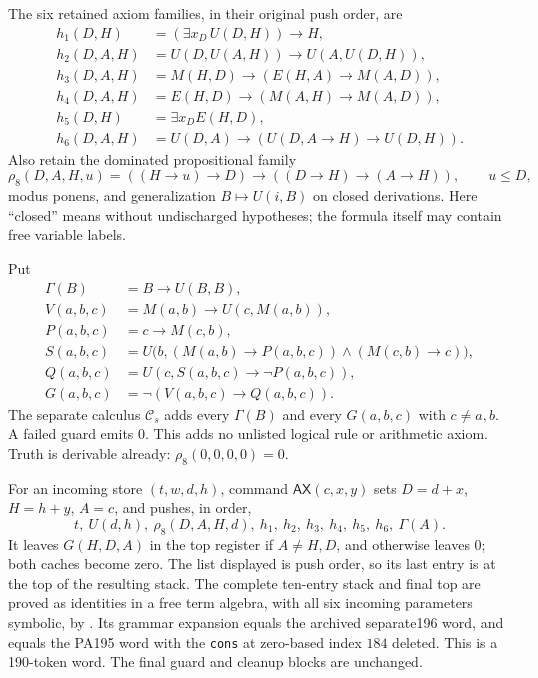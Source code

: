 The six retained axiom families, in their original push order, are
\begin{align*}
 h_1(D,H)&=(\exists x_D\,U(D,H))\to H,\\
 h_2(D,A,H)&=U(D,U(A,H))\to U(A,U(D,H)),\\
 h_3(D,A,H)&=M(H,D)\to(E(H,A)\to M(A,D)),\\
 h_4(D,A,H)&=E(H,D)\to(M(A,H)\to M(A,D)),\\
 h_5(D,H)&=\exists x_D E(H,D),\\
 h_6(D,A,H)&=U(D,A)\to(U(D,A\to H)\to U(D,H)).
\end{align*}
Also retain the dominated propositional family
\[
 \rho_8(D,A,H,u)=((H\to u)\to D)\to
                        ((D\to H)\to(A\to H)),\qquad u\le D,
\]
modus ponens, and generalization $B\mapsto U(i,B)$ on closed
derivations. Here ``closed'' means without undischarged hypotheses;
the formula itself may contain free variable labels.

Put
\begin{align*}
 \Gamma(B)&=B\to U(B,B),\\
 V(a,b,c)&=M(a,b)\to U(c,M(a,b)),\\
 P(a,b,c)&=c\to M(c,b),\\
 S(a,b,c)&=U\bigl(b,(M(a,b)\to P(a,b,c))
                           \wedge(M(c,b)\to c)\bigr),\\
 Q(a,b,c)&=U(c,S(a,b,c)\to\neg P(a,b,c)),\\
 G(a,b,c)&=\neg(V(a,b,c)\to Q(a,b,c)).
\end{align*}
The separate calculus $\mathcal C_s$ adds every $\Gamma(B)$ and
every $G(a,b,c)$ with $c\ne a,b$. A failed guard emits $0$.
This adds no unlisted logical rule or arithmetic axiom. Truth is
derivable already: $\rho_8(0,0,0,0)=0$.

For an incoming store $(t,w,d,h)$, command $\mathsf{AX}(c,x,y)$ sets
$D=d+x$, $H=h+y$, $A=c$, and pushes, in order,
\[
 t,\ U(d,h),\ \rho_8(D,A,H,d),\ h_1,\ h_2,\ h_3,\ h_4,\ h_5,\ h_6,
 \ \Gamma(A).
\]
It leaves $G(H,D,A)$ in the top register if $A\ne H,D$, and
otherwise leaves $0$; both caches become zero. The list displayed
is push order, so its last entry is at the top of the resulting stack.
The complete ten-entry stack and final top are proved as identities
in a free term algebra, with all six incoming parameters symbolic,
by . Its grammar expansion
equals the archived separate196 word, and equals the PA195 word with
the \texttt{cons} at zero-based index $184$ deleted. This is a
190-token word. The final guard and cleanup blocks are unchanged.

